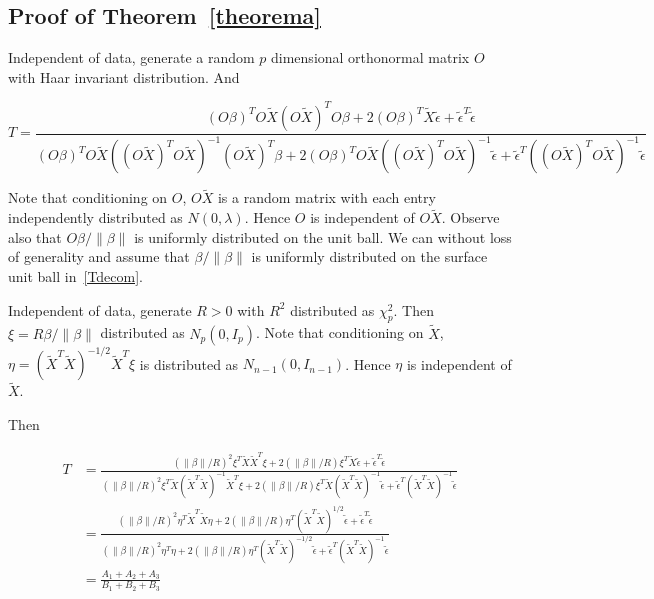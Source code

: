\documentclass[review]{elsarticle}
\theoremstyle{plain}
\theoremstyle{definition}
\theoremstyle{remark}
\begin{document}
\subsection{Proof of Theorem~\ref{theorema}}
Independent of data, generate a random $p$ dimensional orthonormal matrix $O$ with Haar invariant distribution. And 

\begin{equation*}
    T=\frac{{(O\beta)}^T O\tilde{X}{(O\tilde{X})}^T O\beta+
        2{(O\beta)}^T \tilde{X}\tilde{\epsilon}+
        \tilde{\epsilon}^T\tilde{\epsilon}
    }{{(O\beta)}^T O\tilde{X}{({(O\tilde{X})}^T O\tilde{X})}^{-1}{(O\tilde{X})}^T \beta+
        2{(O\beta)}^T O\tilde{X}{({(O\tilde{X})}^T O\tilde{X})}^{-1}\tilde{\epsilon}+
        \tilde{\epsilon}^T{({(O\tilde{X})}^T O\tilde{X})}^{-1}\tilde{\epsilon}
    }
\end{equation*}

Note that conditioning on $O$, $O\tilde{X}$ is a random matrix with each entry independently distributed as $N(0,\lambda)$. Hence $O$ is independent of $O\tilde{X}$. Observe also that $O\beta/\|\beta\|$ is uniformly distributed on the unit ball.  We can without loss of generality and assume that $\beta/\|\beta\|$ is uniformly distributed on the surface unit ball in~\eqref{Tdecom}.

Independent of data, generate $R>0$ with $R^2$ distributed as $\chi^2_{p}$. Then $\xi=R\beta/\|\beta\|$ distributed as $N_p(0,I_p)$.
Note that conditioning on $\tilde{X}$, $\eta={(\tilde{X}^T\tilde{X})}^{-1/2}\tilde{X}^T \xi$ is distributed as $N_{n-1}(0,I_{n-1})$. Hence $\eta$ is independent of $\tilde{X}$.

Then

\begin{equation*}
    \begin{aligned}
        T&=\frac{{(\|\beta\|/R)}^2\xi^T \tilde{X}\tilde{X}^T \xi+
        2(\|\beta\|/R)\xi^T \tilde{X}\tilde{\epsilon}+
        \tilde{\epsilon}^T\tilde{\epsilon}
    }{{(\|\beta\|/R)}^2\xi^T \tilde{X}{(\tilde{X}^T\tilde{X})}^{-1}\tilde{X}^T \xi+
        2(\|\beta\|/R)\xi^T \tilde{X}{(\tilde{X}^T\tilde{X})}^{-1}\tilde{\epsilon}+
        \tilde{\epsilon}^T{(\tilde{X}^T\tilde{X})}^{-1}\tilde{\epsilon}
    }\\
        &=
        \frac{{(\|\beta\|/R)}^2\eta^T \tilde{X}^T\tilde{X} \eta+
        2(\|\beta\|/R)\eta^T {(\tilde{X}^T\tilde{X})}^{1/2}\tilde{\epsilon}+
        \tilde{\epsilon}^T\tilde{\epsilon}
    }{{(\|\beta\|/R)}^2\eta^T\eta+
        2(\|\beta\|/R)\eta^T{(\tilde{X}^T\tilde{X})}^{-1/2}\tilde{\epsilon}+
        \tilde{\epsilon}^T{(\tilde{X}^T\tilde{X})}^{-1}\tilde{\epsilon}
    }\\
        &=\frac{A_1+A_2+A_3}{B_1+B_2+B_3}
    \end{aligned}
\end{equation*}
\end{document}
